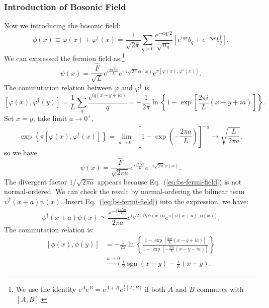 \subsubsection*{Introduction of Bosonic Field}
Now we introducing the bosonic field:
\begin{equation}
	\phi(x) \equiv \varphi(x)+\varphi^{\dagger}(x)
	= \frac{1}{\sqrt{2\pi}} \sum_{q>0} \frac{e^{-a q/2}}{\sqrt{n_q}} \left[e^{i q x} b_{q}+e^{-i q x} b_{q}^{\dagger}\right].
\end{equation}
We can expressed the fermion field as:\footnote{We use the identity $e^A e^B = e^{A+B}e^{\frac{1}{2}[A,B]}$ if both $A$ and $B$ commutes with $[A,B]$.}
\begin{equation*}
	\psi(x) = \frac{\hat{F}}{\sqrt{L}} e^{i\frac{2\pi \hat N x}{L}} e^{-i\sqrt{2\pi}\phi(x)}
	e^{\pi[\varphi(x),\varphi^\dagger(x)]}.
\end{equation*}
The commutation relation between $\varphi$ and $\varphi^\dagger$ is
\begin{equation*}
	\left[\varphi(x),\varphi^\dagger(y)\right]
	= \frac{1}{L} \sum_q \frac{e^{iq(x-y+ia)}}{q} 
	= -\frac{1}{2\pi}\ln\left\{ 1-\exp\left[\frac{2\pi i}{L}(x-y+ia)\right]\right\}.
\end{equation*}
Set $x=y$, take limit $a\rightarrow 0^+$,
\begin{equation*}
	\exp\left\{\pi[\varphi(x),\varphi^\dagger(x)] \right\} = \lim_{a\rightarrow0^+} \left[1-\exp\left(-\frac{2\pi a}{L}\right)\right]^{-\frac{1}{2}}
	\rightarrow \sqrt{\frac{L}{2\pi a}}.
\end{equation*}
so we have
\begin{equation}\label{eq:bs-fermi-field}
	\psi(x) = \frac{\hat{F}}{\sqrt{2\pi a}}e^{i\frac{2\pi\hat N x}{L}}e^{-i\sqrt{2\pi}\phi(x)}.
\end{equation}
The divergent factor $1/\sqrt{2\pi a}$ appears because Eq.~(\ref{eq:bs-fermi-field}) is not normal-ordered.
We can check the result by normal-ordering the bilinear term $\psi^\dagger(x+a)\psi(x)$.
Insert Eq.~(\ref{eq:bs-fermi-field}) into the expression, we have:
\begin{equation}
	\psi^\dagger(x+a)\psi(x)
	\simeq \frac{e^{-i\frac{2\pi\hat N a}{L}}}{2\pi a}
	e^{i\sqrt{2\pi}\partial_x\phi(x)  a} 
	e^{\pi[\phi(x+ a),\phi(x)]}.
\end{equation}
The commutation relation is:
\begin{equation}
\begin{aligned}
	\left[\phi(x),\phi(y)\right] 
	&= -\frac{1}{2\pi}\ln \left\{\frac{1-\exp \left[\frac{2 \pi i}{L}(x-y+i  a)\right]}{1-\exp \left[-\frac{2 \pi i}{L}(x-y-i  a)\right]}\right\} \\
	&\stackrel{ a \rightarrow 0}{\longrightarrow} 
		\frac{i}{2} \operatorname{sgn}(x-y)-\frac{i}{L}(x-y).
\end{aligned}
\end{equation}
